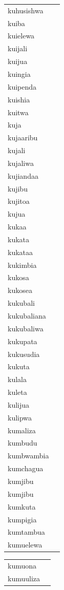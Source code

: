 \documentclass[output=paper,colorlinks,citecolor=brown]{langscibook}
\begin{document}
\begin{table}
\begin{footnotesize}
\begin{minipage}{.24\textwidth}
\begin{tabular}{llllll}
\end{tabular}
\end{minipage}
\begin{minipage}{.24\textwidth}
\begin{tabular}{ll}
kuhusishwa \\ 
kuiba \\ 
kuielewa \\
kuijali \\ 
kuijua \\ 
kuingia \\ 
kuipenda \\ 
kuishia \\ 
kuitwa \\ 
kuja \\ 
kujaaribu \\ 
kujali \\ 
kujaliwa \\ 
kujiandaa \\ 
kujibu \\ 
kujitoa \\ 
kujua \\ 
kukaa \\ 
kukata \\ 
kukataa \\ 
kukimbia \\ 
kukosa \\ 
kukosea \\ 
kukubali \\ 
kukubaliana \\ 
kukubaliwa \\ 
kukupata \\ 
kukusudia \\ 
kukuta \\ 
kulala \\ 
kuleta \\ 
kulijua \\ 
kulipwa \\ 
kumaliza \\ 
kumbudu \\ 
kumbwambia \\ 
kumchagua \\ 
kumjibu \\ 
kumjibu \\ 
kumkuta \\ 
kumpigia \\ 
kumtambua \\ 
kumuelewa \\ 

\end{tabular}
\end{minipage}
\begin{minipage}{.24\textwidth}
\begin{tabular}{ll}
kumuona \\ 
kumuuliza \\ 


\end{tabular}
\end{minipage}
\end{footnotesize}
\end{table}
\end{document}

